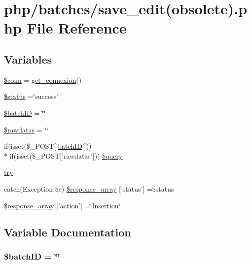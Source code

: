 \hypertarget{batches_2save__edit_07obsolete_08_8php}{\section{php/batches/save\-\_\-edit(obsolete).php File Reference}
\label{batches_2save__edit_07obsolete_08_8php}
}
\subsection*{Variables}
\begin{DoxyCompactItemize}
\item 
\hyperlink{batches_2save__edit_07obsolete_08_8php_aa8a5a87b9c1a6a0819b88447cbe41877}{\$conn} = \hyperlink{php__functions_8php_ace18bc10f3fd08f92688ac743e0d8c2e}{get\-\_\-connexion}()
\item 
\hyperlink{batches_2save__edit_07obsolete_08_8php_a58391ea75f2d29d5d708d7050b641c33}{\$status} =\char`\"{}success\char`\"{}
\item 
\hyperlink{batches_2save__edit_07obsolete_08_8php_aaa6d122ea9cb55b210aadd86e5654a74}{\$batch\-I\-D} = \char`\"{}\char`\"{}
\item 
\hyperlink{batches_2save__edit_07obsolete_08_8php_abdab71b959b28075ae105e76f2bb59c4}{\$rawdatas} = \char`\"{}\char`\"{}
\item 
if(isset(\$\-\_\-\-P\-O\-S\-T\mbox{[}'\hyperlink{obsolete_2processing__bak_8php_a88c5bc4262b7c34f236357f5c53fc99b}{batch\-I\-D}'\mbox{]})) \\*
if(isset(\$\-\_\-\-P\-O\-S\-T\mbox{[}'rawdatas'\mbox{]})) \hyperlink{batches_2save__edit_07obsolete_08_8php_af161305a49807e24a46f54150c411820}{\$query}
\item 
\hyperlink{batches_2save__edit_07obsolete_08_8php_abe4cc9788f52e49485473dc699537388}{try}
\item 
catch(Exception \$e) \hyperlink{batches_2save__edit_07obsolete_08_8php_a8452fb8131316637a04e25f5fde066d9}{\$response\-\_\-array} \mbox{[}'status'\mbox{]} =\$status
\item 
\hyperlink{batches_2save__edit_07obsolete_08_8php_ae768978a0cdc416c0d63d798c85c8784}{\$response\-\_\-array} \mbox{[}'action'\mbox{]} =\char`\"{}Insertion\char`\"{}
\end{DoxyCompactItemize}


\subsection{Variable Documentation}
\hypertarget{batches_2save__edit_07obsolete_08_8php_aaa6d122ea9cb55b210aadd86e5654a74}{
\subsubsection[{\$batch\-I\-D}]{\setlength{\rightskip}{0pt plus 5cm}\${\bf batch\-I\-D} = \char`\"{}\char`\"{}}}\label{batches_2save__edit_07obsolete_08_8php_aaa6d122ea9cb55b210aadd86e5654a74}


